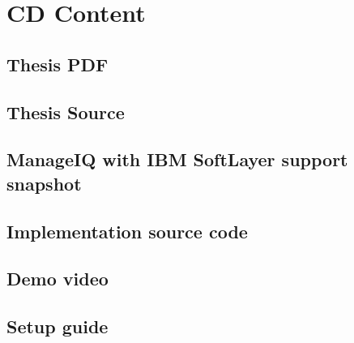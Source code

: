 
\chapter{CD Content}
\section{Thesis PDF}
\section{Thesis Source}
\section{ManageIQ with IBM SoftLayer support snapshot}
\section{Implementation source code}
\section{Demo video}
\section{Setup guide}
